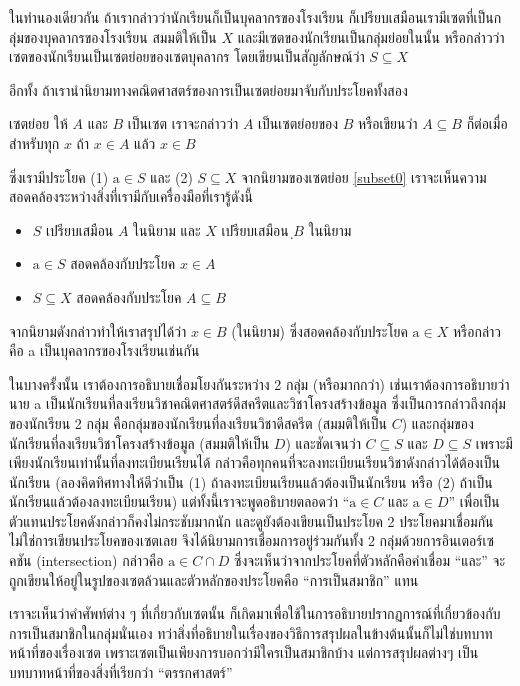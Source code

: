 ในทำนองเดียวกัน ถ้าเรากล่าวว่านักเรียนก็เป็นบุคลากรของโรงเรียน ก็เปรียบเสมือนเรามีเซตที่เป็นกลุ่มของบุคลากรของโรงเรียน สมมติให้เป็น $X$ และมีเซตของนักเรียนเป็นกลุ่มย่อยในนั้น หรือกล่าวว่า เซตของนักเรียนเป็นเซตย่อยของเซตบุคลากร โดยเขียนเป็นสัญลักษณ์ว่า $S \subseteq X$

อีกทั้ง ถ้าเรานำนิยามทางคณิตศาสตร์ของการเป็นเซตย่อยมาจับกับประโยคทั้งสอง
\begin{defn}[label=subset0]{เซตย่อย}{} 
	ให้ $A$ และ $B$ เป็นเซต เราจะกล่าวว่า $A$ เป็นเซตย่อยของ $B$ หรือเขียนว่า $A \subseteq B$ ก็ต่อเมื่อ สำหรับทุก $x$ ถ้า $x\in A$ แล้ว $x\in B$
\end{defn}
\noindent ซึ่งเรามีประโยค (1) $\text{a} \in S$ และ (2) $S \subseteq X$ จากนิยามของเซตย่อย \ref{subset0} เราจะเห็นความสอดคล้องระหว่างสิ่งที่เรามีกับเครื่องมือที่เรารู้ดังนี้
\begin{itemize}
	\item $S$ เปรียบเสมือน $A$ ในนิยาม และ $X$ เปรียบเสมือน $ฺB$ ในนิยาม
	\item $\text{a} \in S$ สอดคล้องกับประโยค $x\in A$
	\item $S \subseteq X$ สอดคล้องกับประโยค $A \subseteq B$
\end{itemize}
จากนิยามดังกล่าวทำให้เราสรุปได้ว่า $x\in B$ (ในนิยาม) ซึ่งสอดคล้องกับประโยค $\text{a} \in X $
หรือกล่าวคือ a เป็นบุคลากรของโรงเรียนเช่นกัน

ในบางครั้งนั้น เราต้องการอธิบายเชื่อมโยงกันระหว่าง 2 กลุ่ม (หรือมากกว่า) เช่นเราต้องการอธิบายว่านาย a เป็นนักเรียนที่ลงเรียนวิชาคณิตศาสตร์ดีสครีตและวิชาโครงสร้างข้อมูล ซึ่งเป็นการกล่าวถึงกลุ่มของนักเรียน 2 กลุ่ม คือกลุ่มของนักเรียนที่ลงเรียนวิชาดีสครีต (สมมติให้เป็น $C$) และกลุ่มของนักเรียนที่ลงเรียนวิชาโครงสร้างข้อมูล (สมมติให้เป็น $D$) และชัดเจนว่า $C\subseteq S$ และ $D\subseteq S$ เพราะมีเพียงนักเรียนเท่านั้นที่ลงทะเบียนเรียนได้ กล่าวคือทุกคนที่จะลงทะเบียนเรียนวิชาดังกล่าวได้ต้องเป็นนักเรียน (ลองคิดทิศทางให้ดีว่าเป็น (1) ถ้าลงทะเบียนเรียนแล้วต้องเป็นนักเรียน หรือ (2) ถ้าเป็นนักเรียนแล้วต้องลงทะเบียนเรียน) แต่ทั้งนี้เราจะพูดอธิบายตลอดว่า ``$\text{a}\in C$ และ $\text{a}\in D$'' เพื่อเป็นตัวแทนประโยคดังกล่าวก็คงไม่กระชับมากนัก และดูยังต้องเขียนเป็นประโยค 2 ประโยคมาเชื่อมกัน ไม่ใช่การเขียนประโยคของเซตเลย จึงได้นิยามการเชื่อมการอยู่ร่วมกันทั้ง 2 กลุ่มด้วยการอินเตอร์เซคชัน (intersection) กล่าวคือ $\text{a}\in C\cap D$ ซึ่งจะเห็นว่าจากประโยคที่ตัวหลักคือคำเชื่อม ``และ'' จะถูกเขียนให้อยู่ในรูปของเซตล้วนและตัวหลักของประโยคคือ ``การเป็นสมาชิก'' แทน

เราจะเห็นว่าคำศัพท์ต่าง ๆ ที่เกี่ยวกับเซตนั้น ก็เกิดมาเพื่อใช้ในการอธิบายปรากฏการณ์ที่เกี่ยวข้องกับการเป็นสมาชิกในกลุ่มนั่นเอง
ทว่าสิ่งที่อธิบายในเรื่องของวิธีการสรุปผลในข้างต้นนั้นก็ไม่ใช่บทบาทหน้าที่ของเรื่องเซต เพราะเซตเป็นเพียงการบอกว่ามีใครเป็นสมาชิกบ้าง แต่การสรุปผลต่างๆ เป็นบทบาทหน้าที่ของสิ่งที่เรียกว่า ``ตรรกศาสตร์''

